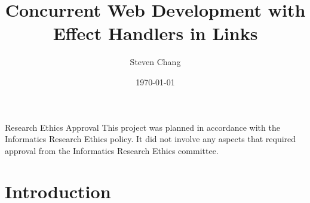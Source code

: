 \documentclass[logo,bsc,singlespacing,parskip]{infthesis}
\begin{document}
\begin{preliminary}

\title{Concurrent Web Development with Effect Handlers in Links}

\author{Steven Chang}




\date{\today}


\maketitle

\newenvironment{ethics}
   {\begin{frontenv}{Research Ethics Approval}{\LARGE}}
   {\end{frontenv}\newpage}

\begin{ethics}
This project was planned in accordance with the Informatics Research
Ethics policy. It did not involve any aspects that required approval
from the Informatics Research Ethics committee.

\standarddeclaration
\end{ethics}


\begin{acknowledgements}

\end{acknowledgements}


\tableofcontents
\end{preliminary}


\chapter{Introduction}
\end{document}
